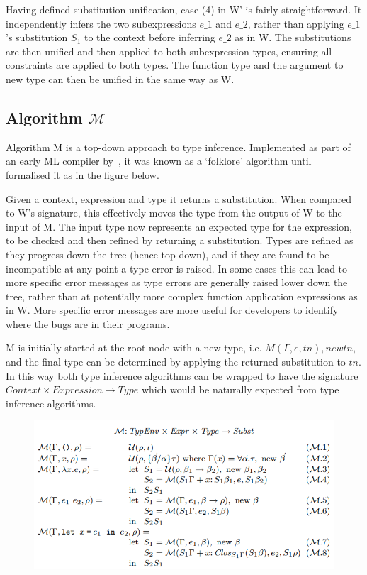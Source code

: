 \documentclass[a4paper,fleqn,oneside,12pt]{report}
\newcommand{\M}{$\mathcal{M}$}
\begin{document}
Having defined substitution unification, case (4) in W’ is fairly straightforward. It independently infers the two subexpressions $e\_1$ and $e\_2$, rather than applying $e\_1$’s substitution $S_1$ to the context before inferring $e\_2$ as in W. The substitutions are then unified and then applied to both subexpression types, ensuring all constraints are applied to both types. The function type and the argument to new type can then be unified in the same way as W.

\subsection{Algorithm \texorpdfstring{\M}{M}}

Algorithm M is a top-down approach to type inference. Implemented as part of an early ML compiler by~\cite{ref32}, it was known as a ‘folklore’ algorithm until~\cite{ref33} formalised it as in the figure below.

Given a context, expression and type it returns a substitution. When compared to W’s signature, this effectively moves the type from the output of W to the input of M. The input type now represents an expected type for the expression, to be checked and then refined by returning a substitution. Types are refined as they progress down the tree (hence top-down), and if they are found to be incompatible at any point a type error is raised. In some cases this can lead to more specific error messages as type errors are generally raised lower down the tree, rather than at potentially more complex function application expressions as in W. More specific error messages are more useful for developers to identify where the bugs are in their programs.

M is initially started at the root node with a new type, i.e. $M(\Gamma, e, tn), new tn$, and the final type can be determined by applying the returned substitution to $tn$. In this way both type inference algorithms can be wrapped to have the signature $Context \times Expression \rightarrow Type$ which would be naturally expected from type inference algorithms.

\begin{figure}[h!]
  \centering
  \includegraphics[width=1.000\linewidth]{images/image7.png}
\end{figure}
\end{document}
